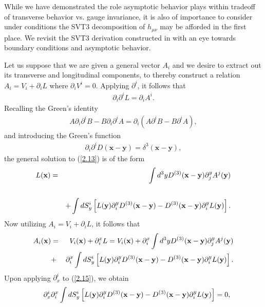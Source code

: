 While we have demonstrated the role asymptotic behavior plays within tradeoff of transverse behavior vs. gauge invariance, it is also of importance to consider under conditions the SVT3 decomposition of $h_{\mu\nu}$ may be afforded in the first place. We revisit the SVT3 derivation constructed in \cite{amarasinghe_2019} with an eye towards boundary conditions and asymptotic behavior. 

Let us suppose that we are given a general vector $A_i$ and we desire to extract out its transverse and longitudinal components, to thereby construct a relation $A_i=V_i+\partial_iL$ where $\partial_iV^i=0$. Applying $\partial^i$, it follows that
%
\begin{eqnarray}
\partial_i\partial^iL=\partial_iA^i.
\label{2.13}
\end{eqnarray}
%
Recalling the Green's identity
%
\begin{eqnarray}
A \partial_i\partial^iB-B \partial_i\partial^iA=\partial_i(A\partial^iB-B\partial^iA),
\label{1.9}
\end{eqnarray}
and introducing the Green's function
%
\begin{eqnarray}
\partial_i\partial^i D(\mathbf x-\mathbf y) = \delta^3(\mathbf x- \mathbf y),
\end{eqnarray}
%
the general  solution to (\ref{2.13}) is of the form 
%
\begin{eqnarray}
L({\bf x})&=&\int d^3yD^{(3)}(\mathbf{x}-\mathbf{y})\partial^y_jA^j({\bf y})\\
\nonumber\\
&&+\int dS_y^i\left[L({\bf y})\partial^y_iD^{(3)}(\mathbf{x}-\mathbf{y})-D^{(3)}(\mathbf{x}-\mathbf{y})\partial^y_iL({\bf y})\right].
\label{2.14}
\end{eqnarray}
%
Now utilizing $A_i = V_i + \partial_i L$, it follows that 
%
\begin{eqnarray}
A_i({\bf x})&=&V_i({\bf x})+\partial^x_iL=V_i({\bf x})+\partial^x_i\int d^3yD^{(3)}(\mathbf{x}-\mathbf{y})\partial^y_jA^j({\bf y})
\nonumber\\
&+&\partial^x_i\int dS_y^i\left[L({\bf y})\partial^y_iD^{(3)}(\mathbf{x}-\mathbf{y})-D^{(3)}(\mathbf{x}-\mathbf{y})\partial^y_iL({\bf y})\right].
\label{2.15}
\end{eqnarray}
%
Upon applying $\partial_x^i$ to (\ref{2.15}), we obtain
%
\begin{eqnarray}
&&\partial_x^i\partial^x_i\int dS_y^i\left[L({\bf y})\partial^y_iD^{(3)}(\mathbf{x}-\mathbf{y})-D^{(3)}(\mathbf{x}-\mathbf{y})\partial^y_iL({\bf y})\right]=0,
\label{2.16}
\end{eqnarray}
